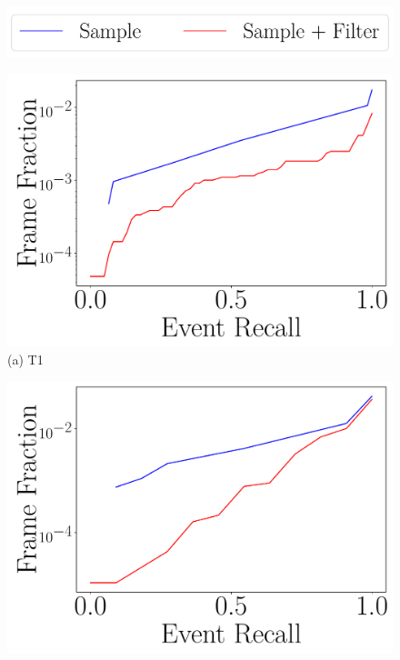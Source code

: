 \begin{figure}
    \centering
    \includegraphics[width=0.7\linewidth]{FIGS/fig-recall-frame-aggregated-legend.pdf}

    \begin{minipage}[]{0.47\linewidth}
        \centering
        \includegraphics[trim={0.5cm 0.5cm 0 0},clip,width=\linewidth]{FIGS/fig-random-select-and-filter-recall-frame-okutama-aggregated.pdf}\\
        {(a) T1}
    \end{minipage}
    \begin{minipage}[]{0.47\linewidth}
        \centering
        \includegraphics[trim={0.5cm 0.5cm 0 0},clip,width=\linewidth]{FIGS/fig-random-select-and-filter-recall-frame-stanford-aggregated.pdf}

\end{minipage}
\end{figure}
